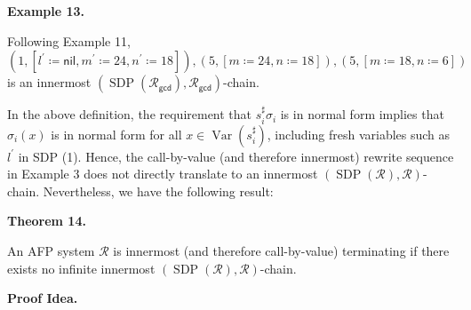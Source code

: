  
 
 
\par\medskip\noindent\textbf{Example 13.}\par
 
 
Following Example 11, $(\text{1},[{l^{\prime}}\coloneq{\mathsf{nil}},{m^{\prime}}\coloneq{24},{n^{\prime}}\coloneq{18}]),(\text{5},[{m}\coloneq{24},{n}\coloneq{18}]),(\text{5},[{m}\coloneq{18},{n}\coloneq{6}])$ is an innermost $(\operatorname{SDP}(\mathcal{R}_{\mathsf{gcd}}),\mathcal{R}_{\mathsf{gcd}})$-chain.\par
 
 
 
 
In the above definition, the requirement that $s_{i}^{\sharp}\sigma_{i}$ is in normal form implies that $\sigma_{i}(x)$ is in normal form for all $x\in\operatorname{Var}(s_{i}^{\sharp})$, including fresh variables such as $l^{\prime}$ in SDP (1). Hence, the call-by-value (and therefore innermost) rewrite sequence in Example 3 does not directly translate to an innermost $(\operatorname{SDP}(\mathcal{R}),\mathcal{R})$-chain. Nevertheless, we have the following result:\par
 
 
 
\par\medskip\noindent\textbf{Theorem 14.}\par
 
 
An AFP system $\mathcal{R}$ is innermost (and therefore call-by-value) terminating if there exists no infinite innermost $(\operatorname{SDP}(\mathcal{R}),\mathcal{R})$-chain.\par
 
 
 
 
\par\medskip\noindent\textbf{Proof Idea.}\par
 
 
